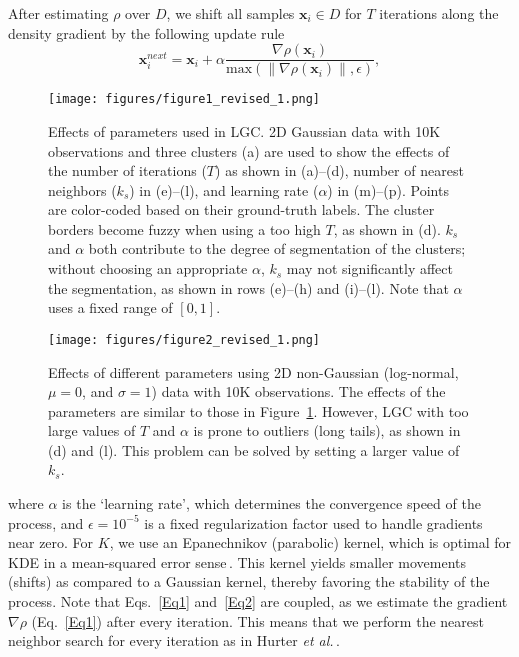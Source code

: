 \documentclass[sagev,Afour,times]{sagej}
\begin{document}
After estimating $\rho$ over $D$, we shift all samples $\mathbf{x}_i \in D$ for $T$ iterations along the density gradient by the following update rule
%
\begin{equation}
\label{Eq2}
	\mathbf{x}_i^{next} = \mathbf{x}_i + \alpha\frac{\nabla \rho(\mathbf{x}_i)}{\mbox{max}(\| \nabla\rho(\mathbf{x}_i)\|, \epsilon )},
\end{equation}
%
%
\begin{figure}[htb]
  \centering
  \texttt{[image: figures/figure1\_revised\_1.png]}
  \parbox[t]{1\columnwidth}{\relax}
  \caption{\label{fig:1params_gaussian} Effects of parameters used in LGC. 2D Gaussian data with 10$\mathrm{K}$ observations and three clusters (a) are used to show the effects of the number of iterations ($T$) as shown in (a)--(d), number of nearest neighbors ($k_s$) in (e)--(l), and learning rate ($\alpha$) in (m)--(p). Points are color-coded based on their ground-truth labels. The cluster borders become fuzzy when using a too high $T$, as shown in (d). $k_s$ and $\alpha$ both contribute to the degree of segmentation of the clusters; without choosing an appropriate $\alpha$, $k_s$ may not significantly affect the segmentation, as shown in rows (e)--(h) and (i)--(l). Note that $\alpha$ uses a fixed range of $[0,1]$.}
\end{figure}
%
\begin{figure}[htb]
  \centering
  \texttt{[image: figures/figure2\_revised\_1.png]}
  \parbox[t]{1\columnwidth}{\relax}
  \caption{\label{fig:2params_non_Gaussian} Effects of different parameters using 2D non-Gaussian (log-normal, $\mu=0$, and $\sigma=1$) data with 10$\mathrm{K}$ observations. The effects of the parameters are similar to those in Figure~\ref{fig:1params_gaussian}. However, LGC with too large values of $T$ and $\alpha$ is prone to outliers (long tails), as shown in (d) and (l). This problem can be solved by setting a larger value of $k_s$.
  }
\end{figure}
%
where $\alpha$ is the `learning rate', which determines the convergence speed of the process, and $\epsilon=10^{-5}$ is a fixed regularization factor used to handle gradients near zero. For $K$, we use an Epanechnikov (parabolic) kernel, which is optimal for KDE in a mean-squared error sense\,\cite{epanechnikov:mse}. This kernel yields smaller movements (shifts) as compared to a Gaussian kernel, thereby favoring the stability of the process. Note that Eqs.~\ref{Eq1} and~\ref{Eq2} are coupled, as we estimate the gradient $\nabla\rho$ (Eq.~\ref{Eq1}) after every iteration. This means that we perform the nearest neighbor search for every iteration as in Hurter \emph{et al.}\,\cite{alex1}.
\end{document}
